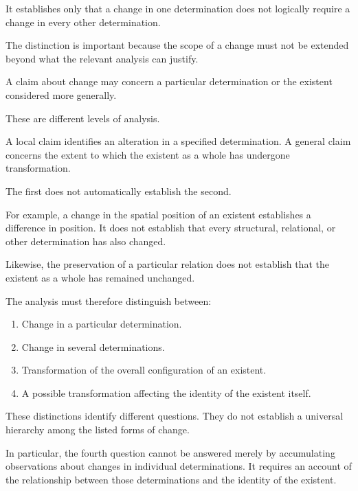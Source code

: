 It establishes only that a change in one
determination does not logically require
a change in every other determination.

The distinction is important because the
scope of a change must not be extended
beyond what the relevant analysis can
justify.


A claim about change may concern a particular
determination or the existent considered
more generally.

These are different levels of analysis.

A local claim identifies an alteration in
a specified determination. A general claim
concerns the extent to which the existent
as a whole has undergone transformation.

The first does not automatically establish
the second.

For example, a change in the spatial position
of an existent establishes a difference in
position. It does not establish that every
structural, relational, or other determination
has also changed.

Likewise, the preservation of a particular
relation does not establish that the existent
as a whole has remained unchanged.

The analysis must therefore distinguish
between:

\begin{enumerate}
    \item Change in a particular determination.
    \item Change in several determinations.
    \item Transformation of the overall
    configuration of an existent.
    \item A possible transformation affecting
    the identity of the existent itself.
\end{enumerate}

These distinctions identify different questions.
They do not establish a universal hierarchy
among the listed forms of change.

In particular, the fourth question cannot
be answered merely by accumulating observations
about changes in individual determinations.
It requires an account of the relationship
between those determinations and the identity
of the existent.

